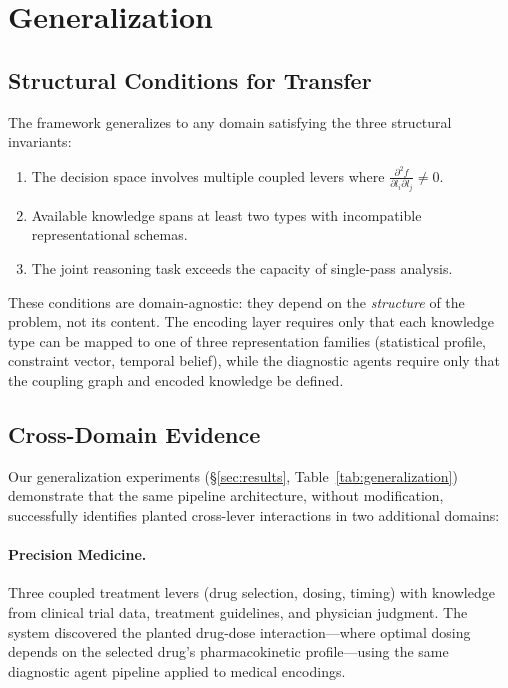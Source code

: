 \section{Generalization}
\label{sec:generalization}

\subsection{Structural Conditions for Transfer}

The framework generalizes to any domain satisfying the three structural invariants:
\begin{enumerate}
    \item The decision space involves multiple coupled levers where $\frac{\partial^2 f}{\partial l_i \partial l_j} \neq 0$.
    \item Available knowledge spans at least two types with incompatible representational schemas.
    \item The joint reasoning task exceeds the capacity of single-pass analysis.
\end{enumerate}

These conditions are domain-agnostic: they depend on the \emph{structure} of the problem, not its content.
The encoding layer requires only that each knowledge type can be mapped to one of three representation families (statistical profile, constraint vector, temporal belief), while the diagnostic agents require only that the coupling graph and encoded knowledge be defined.

\subsection{Cross-Domain Evidence}

Our generalization experiments (\S\ref{sec:results}, Table~\ref{tab:generalization}) demonstrate that the same pipeline architecture, without modification, successfully identifies planted cross-lever interactions in two additional domains:

\paragraph{Precision Medicine.}
Three coupled treatment levers (drug selection, dosing, timing) with knowledge from clinical trial data, treatment guidelines, and physician judgment.
The system discovered the planted drug-dose interaction---where optimal dosing depends on the selected drug's pharmacokinetic profile---using the same diagnostic agent pipeline applied to medical encodings.


